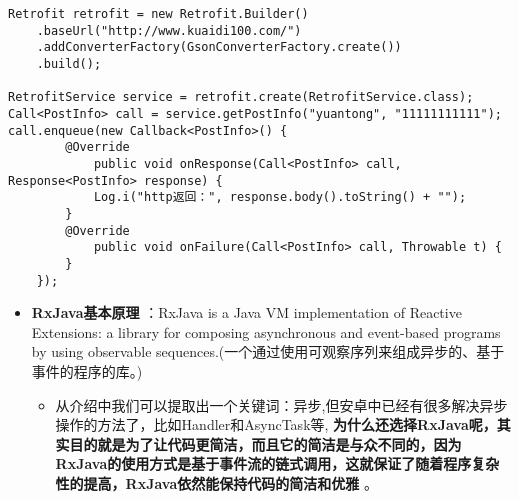 \documentclass[9pt, b5paper]{article}
\begin{document}
\begin{verbatim}
Retrofit retrofit = new Retrofit.Builder()
    .baseUrl("http://www.kuaidi100.com/")
    .addConverterFactory(GsonConverterFactory.create())
    .build();
        
RetrofitService service = retrofit.create(RetrofitService.class);
Call<PostInfo> call = service.getPostInfo("yuantong", "11111111111");
call.enqueue(new Callback<PostInfo>() {
        @Override
            public void onResponse(Call<PostInfo> call, Response<PostInfo> response) {
            Log.i("http返回：", response.body().toString() + "");
        }
        @Override
            public void onFailure(Call<PostInfo> call, Throwable t) {
        }
    });
\end{verbatim}
\begin{itemize}
\item \textbf{RxJava基本原理} ：RxJava is a Java VM implementation of Reactive Extensions: a library for composing asynchronous and event-based programs by using observable sequences.(一个通过使用可观察序列来组成异步的、基于事件的程序的库。)
\begin{itemize}
\item 从介绍中我们可以提取出一个关键词：异步,但安卓中已经有很多解决异步操作的方法了，比如Handler和AsyncTask等, \textbf{为什么还选择RxJava呢，其实目的就是为了让代码更简洁，而且它的简洁是与众不同的，因为RxJava的使用方式是基于事件流的链式调用，这就保证了随着程序复杂性的提高，RxJava依然能保持代码的简洁和优雅} 。
\end{itemize}


\end{itemize}
\end{document}
